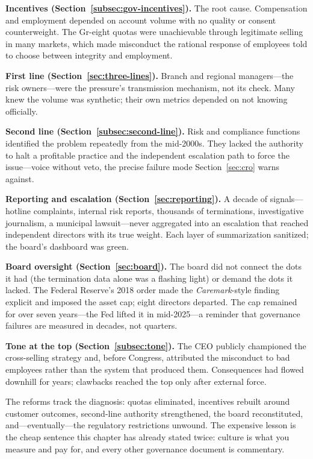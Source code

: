 \documentclass[11pt,openany]{book}
\begin{document}
\textbf{Incentives (Section~\ref{subsec:gov-incentives}).} The root cause.
Compensation and employment depended on account volume with no quality or
consent counterweight. The Gr-eight quotas were unachievable through
legitimate selling in many markets, which made misconduct the rational
response of employees told to choose between integrity and employment.

\textbf{First line (Section~\ref{sec:three-lines}).} Branch and regional
managers---the risk owners---were the pressure's transmission mechanism, not
its check. Many knew the volume was synthetic; their own metrics depended on
not knowing officially.

\textbf{Second line (Section~\ref{subsec:second-line}).} Risk and compliance
functions identified the problem repeatedly from the mid-2000s. They lacked
the authority to halt a profitable practice and the independent escalation
path to force the issue---voice without veto, the precise failure mode
Section~\ref{sec:cro} warns against.

\textbf{Reporting and escalation (Section~\ref{sec:reporting}).} A decade of
signals---hotline complaints, internal risk reports, thousands of
terminations, investigative journalism, a municipal lawsuit---never
aggregated into an escalation that reached independent directors with its
true weight. Each layer of summarization sanitized; the board's dashboard was
green.

\textbf{Board oversight (Section~\ref{sec:board}).} The board did not connect
the dots it had (the termination data alone was a flashing light) or demand
the dots it lacked. The Federal Reserve's 2018 order made the
\emph{Caremark}-style finding explicit and imposed the asset cap; eight
directors departed. The cap remained for over seven years---the Fed lifted it
in mid-2025---a reminder that governance failures are measured in decades,
not quarters.

\textbf{Tone at the top (Section~\ref{subsec:tone}).} The CEO publicly
championed the cross-selling strategy and, before Congress, attributed the
misconduct to bad employees rather than the system that produced them.
Consequences had flowed downhill for years; clawbacks reached the top only
after external force.

The reforms track the diagnosis: quotas eliminated, incentives rebuilt around
customer outcomes, second-line authority strengthened, the board
reconstituted, and---eventually---the regulatory restrictions unwound. The
expensive lesson is the cheap sentence this chapter has already stated twice:
culture is what you measure and pay for, and every other governance document
is commentary.
\end{document}
